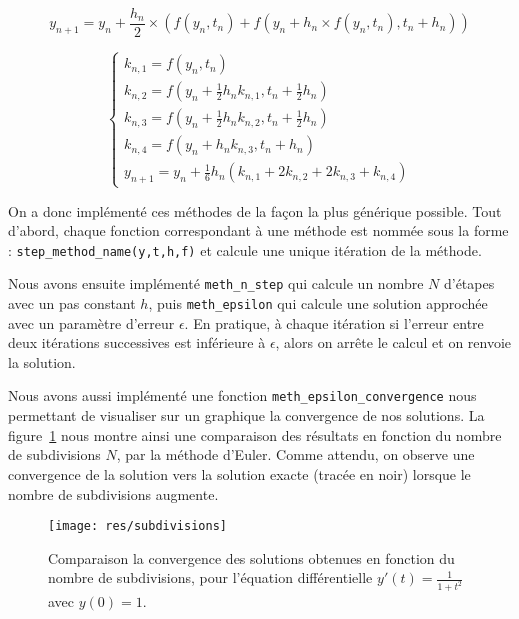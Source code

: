 \begin{equation}
		y_{n+1} = y_n + \frac{h_n}{2} \times (f(y_n, t_n) + f(y_n + h_n \times f(y_n, t_n), t_n + h_n))
	\label{eq:heun}
\end{equation}

\begin{equation}
	\begin{cases}
		k_{n, 1} = f(y_n, t_n)\\
		k_{n, 2} = f(y_n + \frac{1}{2} h_n k_{n, 1}, t_n + \frac{1}{2}h_n)\\
		k_{n, 3} = f(y_n + \frac{1}{2} h_n k_{n, 2}, t_n + \frac{1}{2}h_n)\\
		k_{n, 4} = f(y_n + h_n k_{n, 3}, t_n + h_n)\\
		y_{n+1} = y_n + \frac{1}{6} h_n (k_{n, 1} + 2k_{n, 2} + 2k_{n, 3} + k_{n, 4})
	\end{cases}
	\label{eq:runge-kutta}
\end{equation}

On a donc implémenté ces méthodes de la façon la plus générique possible. Tout d'abord, 
chaque fonction correspondant à une méthode est nommée sous la forme : \texttt{step\_method\_name(y,t,h,f)} et calcule
une unique itération de la méthode.

Nous avons ensuite implémenté \texttt{meth\_n\_step} qui calcule un nombre $N$ d'étapes avec un pas constant $h$,
puis \texttt{meth\_epsilon} qui calcule une solution approchée avec un paramètre d’erreur $\epsilon$.
En pratique, à chaque itération si l'erreur entre deux itérations successives est inférieure à $\epsilon$,
alors on arrête le calcul et on renvoie la solution.

Nous avons aussi implémenté une fonction \texttt{meth\_epsilon\_convergence} nous permettant de visualiser
sur un graphique la convergence de nos solutions.
La figure~\ref{fig:subdivision} nous montre ainsi une comparaison des résultats en fonction
du nombre de subdivisions $N$, par la méthode d'Euler.
Comme attendu, on observe une convergence de la solution vers la solution exacte (tracée en noir)
lorsque le nombre de subdivisions augmente.

\begin{figure}[htbp!]
	\centering
	\texttt{[image: res/subdivisions]}
	\caption{Comparaison la convergence des solutions obtenues en fonction du nombre de subdivisions, pour l'équation différentielle $y'(t) = \frac{1}{1 + t^2}$ avec $y(0) = 1$.}
	\label{fig:subdivision}
\end{figure}

